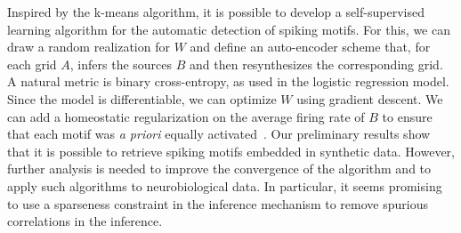 \documentclass[runningheads]{llncs}
\begin{document}
Inspired by the k-means algorithm, it is possible to develop a self-supervised learning algorithm for the automatic detection of spiking motifs. For this, we can draw a random realization for $W$ and define an auto-encoder scheme that, for each grid $A$, infers the sources $B$ and then resynthesizes the corresponding grid. A natural metric is binary cross-entropy, as used in the logistic regression model. Since the model is differentiable, we can optimize $W$ using gradient descent. We can add a homeostatic regularization on the average firing rate of $B$ to ensure that each motif was \emph{a priori} equally activated~\cite{perrinet_role_2010,perrinet_adaptive_2019}. Our preliminary results show that it is possible to retrieve spiking motifs embedded in synthetic data. However, further analysis is needed to improve the convergence of the algorithm and to apply such algorithms to neurobiological data. In particular, it seems promising to use a sparseness constraint in the inference mechanism to remove spurious correlations in the inference.
%
%
%
%
\end{document}
